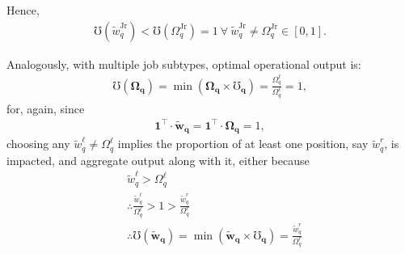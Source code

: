\documentclass[hidelinks, nonatbib]{elsarticle}
\begin{document}
\begin{enumerate}
    Hence, 
    \begin{gather}
        \mho(\tilde{w}_{q}^{\text{Jr}}) < 
        \mho(\Omega_{q}^{\text{Jr}}) 
        = 1
        \
        \forall
        \
        \tilde{w}_{q}^{\text{Jr}}
        \neq
        \Omega_{q}^{\text{Jr}}
        \in [0,1]
        .
    \end{gather}

    Analogously, with multiple job subtypes, optimal operational output is:
    \begin{gather}
        \mho(\boldsymbol{\Omega_q})
        = 
        \min(
            \boldsymbol{\Omega_q}
            \times
            \boldsymbol{\mho_q}
        )
        =
        \frac{
            \Omega_{q}^{\ell}
        }{
            \Omega_{q}^{\ell}
        }
        =
        1
        ,
    \end{gather}
    for, again, since
    \begin{gather}
        \boldsymbol{1} ^ {\top}
        \cdot
        \boldsymbol{\tilde{w}_{q}}
        =
        \boldsymbol{1} ^ {\top}
        \cdot
        \boldsymbol{\Omega_{q}}
        = 1
        ,
    \end{gather}
    choosing any $\tilde{w}_{q}^{\ell} \neq \Omega_{q}^{\ell}$ implies the proportion of at least one position, say $\tilde{w}_{q}^{r}$, is impacted, and aggregate output along with it, either because
    \begin{align}
        &
        \tilde{w}_{q}^{\ell} > \Omega_{q}^{\ell}
        \\
        &\therefore
        \frac{
            \tilde{w}_{q}^{\ell}
        }{
            \Omega_{q}^{\ell}
        }
        > 
        1
        > 
        \frac{
            \tilde{w}_{q}^{r}
        }{
            \Omega_{q}^{r}
        }
        \\
        &\therefore
        \mho(\boldsymbol{\tilde{w}_q})
        = 
        \min(
            \boldsymbol{\tilde{w}_q}
            \times
            \boldsymbol{\mho_q}
        )
        =
        \frac{
            \tilde{w}_{q}^{r}
        }{
            \Omega_{q}^{r}
}
\end{align}
\end{enumerate}
\end{document}
